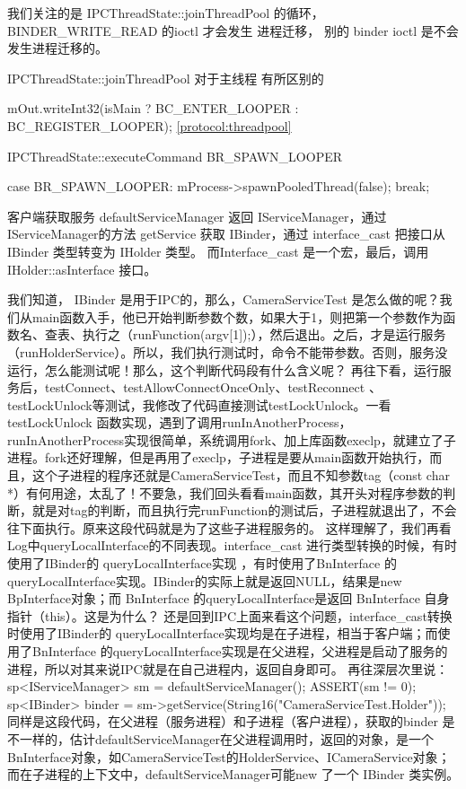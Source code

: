 \documentclass[a4paper,11pt]{article}
\begin{document}
我们关注的是 IPCThreadState::joinThreadPool 的循环，BINDER_WRITE_READ 的ioctl
才会发生 进程迁移， 别的 binder ioctl 是不会发生进程迁移的。


IPCThreadState::joinThreadPool 对于主线程 有所区别的

 mOut.writeInt32(isMain ? BC_ENTER_LOOPER : BC_REGISTER_LOOPER);
\ref{protocol:threadpool}

IPCThreadState::executeCommand  BR_SPAWN_LOOPER 

case BR_SPAWN_LOOPER:
        mProcess->spawnPooledThread(false);
        break;


客户端获取服务
defaultServiceManager  返回 IServiceManager，通过 IServiceManager的方法 getService 获取 IBinder，通过 interface_cast 把接口从 IBinder 类型转变为 IHolder 类型。
而Interface_cast 是一个宏，最后，调用 IHolder::asInterface 接口。

我们知道， IBinder 是用于IPC的，那么，CameraServiceTest 是怎么做的呢？我们从main函数入手，他已开始判断参数个数，如果大于1，则把第一个参数作为函数名、查表、执行之（runFunction(argv[1]);），然后退出。之后，才是运行服务 （runHolderService）。所以，我们执行测试时，命令不能带参数。否则，服务没运行，怎么能测试呢！那么，这个判断代码段有什么含义呢？
再往下看，运行服务后，testConnect、testAllowConnectOnceOnly、testReconnect 、testLockUnlock等测试，我修改了代码直接测试testLockUnlock。一看testLockUnlock 函数实现，遇到了调用runInAnotherProcess，runInAnotherProcess实现很简单，系统调用fork、加上库函数execlp，就建立了子进程。fork还好理解，但是再用了execlp，子进程是要从main函数开始执行，而且，这个子进程的程序还就是CameraServiceTest，而且不知参数tag（const char *）有何用途，太乱了！不要急，我们回头看看main函数，其开头对程序参数的判断，就是对tag的判断，而且执行完runFunction的测试后，子进程就退出了，不会往下面执行。原来这段代码就是为了这些子进程服务的。
这样理解了，我们再看Log中queryLocalInterface的不同表现。interface_cast 进行类型转换的时候，有时使用了IBinder的 queryLocalInterface实现 ，有时使用了BnInterface 的queryLocalInterface实现。IBinder的实际上就是返回NULL，结果是new BpInterface对象；而
BnInterface 的queryLocalInterface是返回 BnInterface 自身指针（this）。这是为什么？ 还是回到IPC上面来看这个问题，interface_cast转换时使用了IBinder的 queryLocalInterface实现均是在子进程，相当于客户端；而使用了BnInterface 的queryLocalInterface实现是在父进程，父进程是启动了服务的进程，所以对其来说IPC就是在自己进程内，返回自身即可。
再往深层次里说：
    sp<IServiceManager> sm = defaultServiceManager();
    ASSERT(sm != 0);
    sp<IBinder> binder = sm->getService(String16("CameraServiceTest.Holder"));
同样是这段代码，在父进程（服务进程）和子进程（客户进程），获取的binder 是不一样的，估计defaultServiceManager在父进程调用时，返回的对象，是一个 BnInterface对象，如CameraServiceTest的HolderService、ICameraService对象；而在子进程的上下文中，defaultServiceManager可能new 了一个 IBinder 类实例。
\end{document}
